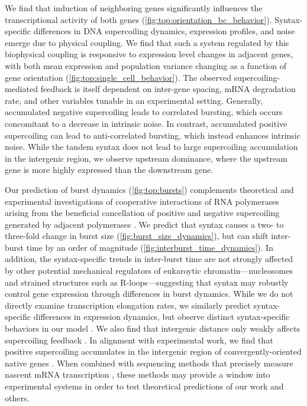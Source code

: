\documentclass[11pt]{article}
\begin{document}
We find that induction of neighboring genes significantly influences the transcriptional activity of both genes (\cref{fig:top:orientation_bc_behavior}). Syntax-specific differences in DNA supercoiling dynamics, expression profiles, and noise emerge due to physical coupling. We find that such a system regulated by this biophysical coupling is responsive to expression level changes in adjacent genes, with both mean expression and population variance changing as a function of gene orientation (\cref{fig:top:single_cell_behavior}). The observed supercoiling-mediated feedback is itself dependent on inter-gene spacing, mRNA degradation rate, and other variables tunable in an experimental setting. Generally, accumulated negative supercoiling leads to correlated bursting, which occurs concomitant to a decrease in intrinsic noise. In contrast, accumulated positive supercoiling can lead to anti-correlated bursting, which instead enhances intrinsic noise. While the tandem syntax does not lead to large supercoiling accumulation in the intergenic region, we observe upstream dominance, where the upstream gene is more highly expressed than the downstream gene.

Our prediction of burst dynamics (\cref{fig:top:bursts}) complements theoretical and experimental investigations of cooperative interactions of RNA polymerases arising from the beneficial cancellation of positive and negative supercoiling generated by adjacent polymerases \parencite{sevierCollectivePolymeraseDynamics2022,kimLongDistanceCooperativeAntagonistic2019}. We predict that syntax causes a two- to three-fold change in burst size (\cref{fig:burst_size_dynamics}), but can shift inter-burst time by an order of magnitude (\cref{fig:interburst_time_dynamics}). In addition, the syntax-specific trends in inter-burst time are not strongly affected by other potential mechanical regulators of eukaroytic chromatin---nucleosomes and strained structures such as R-loops---suggesting that syntax may robustly control gene expression through differences in burst dynamics.
While we do not directly examine transcription elongation rates, we similarly predict syntax-specific differences in expression dynamics, but observe distinct syntax-specific behaviors in our model \parencite{sevierCollectivePolymeraseDynamics2022,tripathiDNASupercoilingmediatedCollective2021}.  We also find that intergenic distance only weakly affects supercoiling feedback \parencite{tripathiDNASupercoilingmediatedCollective2021}.
 In alignment with experimental work, we find that  positive supercoiling accumulates in the intergenic region of convergently-oriented native genes \parencite{guoHighresolutionGenomewideMapping2021}. When combined with sequencing methods that precisely measure nascent mRNA transcription \parencite{mellorInterleavedGenome2016}, these methods may provide a window into experimental systems in order to test theoretical predictions of our work and others.
\end{document}
